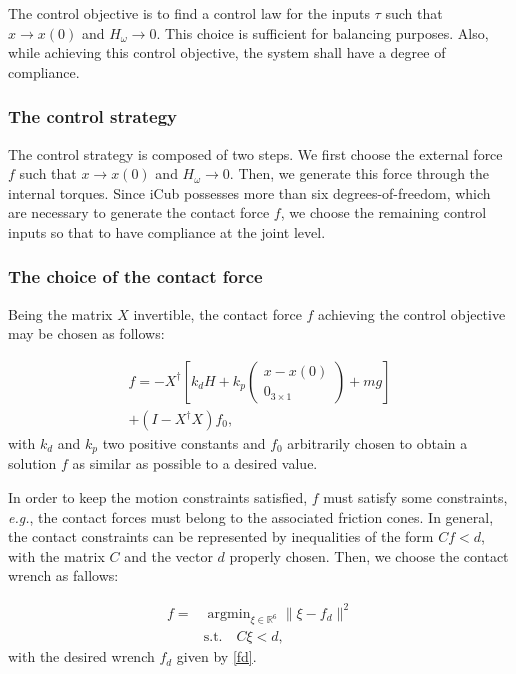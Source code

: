 \documentclass[final,5p,twocolumn]{elsarticle}
\DeclareMathOperator*{\argmin}{argmin}
\begin{document}
The control objective is to find a control law for the inputs $\tau$ such that $x \rightarrow x(0)$ and $H_\omega \rightarrow 0$. This choice is sufficient for balancing purposes. Also, while achieving this control objective, the system shall have a degree of compliance.

\subsubsection{The control strategy}
The control strategy is composed of two steps. We first choose the external force $f$ such that $x \rightarrow x(0)$ and $H_\omega \rightarrow 0$. Then, we generate this force through the internal torques. Since iCub possesses more than six degrees-of-freedom, which are necessary to generate the contact force $f$, we choose the remaining control inputs so that to have compliance at the joint level.

\subsubsection{The choice of the contact force}

Being the matrix $X$ invertible, the contact force $f$ achieving the control objective may be chosen as follows:

\begin{multline} 
    \label{fd}
   f = -X^{\dagger}\left[k_d H + k_p\begin{pmatrix} x-x(0) \\ 0_{3\times1}  \end{pmatrix} + mg\right] \\ + \left( I - X^{\dagger} X \right) f_0, 
\end{multline}
 with $k_d$ and $k_p$ two positive constants and $f_0$ arbitrarily chosen to obtain a solution $f$ as similar as possible to a desired value.
 
 In order to keep the motion constraints satisfied, $f$ must satisfy some constraints, \textit{e.g.}, the contact forces
 must belong to the associated friction cones. In general, the contact constraints can be represented by inequalities of the 
 form $Cf < d$, with the matrix $C$ and the vector $d$ properly chosen. Then, we choose the contact wrench  as fallows:

\begin{subequations} \label{eq:TSID}
\begin{align}
\label{eq:torquesTSID}
  f = & \argmin_{  \xi \in \mathbb{R}^6} \|   \xi -   f_d\|^2 \\
\label{eq:dynTSID}
& \mbox{s.t.}  \quad C\xi < d, 
\end{align}
\end{subequations}
with the desired wrench $f_d$ given by \eqref{fd}.
\end{document}
